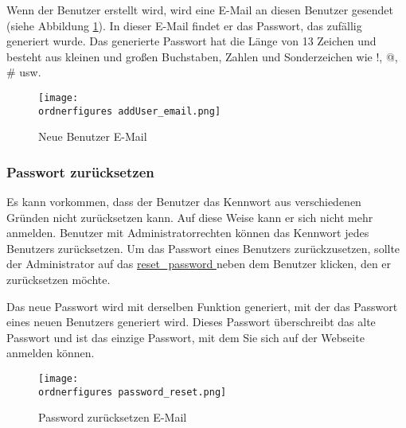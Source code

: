Wenn der Benutzer erstellt wird, wird eine E-Mail an diesen Benutzer gesendet (siehe Abbildung \ref{fi:addUser_email}). In dieser E-Mail findet er das Passwort, das zufällig generiert wurde. Das generierte Passwort hat die Länge von 13 Zeichen und besteht aus kleinen und großen Buchstaben, Zahlen und Sonderzeichen wie !, @, \# usw.
\begin{figure}[H]
	\centering
	\texttt{[image: \\ordnerfigures addUser\_email.png]}
	\caption{Neue Benutzer E-Mail}
	\label{fi:addUser_email}
\end{figure}


\subsubsection{Passwort zurücksetzen}

Es kann vorkommen, dass der Benutzer das Kennwort aus verschiedenen Gründen nicht zurücksetzen kann. Auf diese Weise kann er sich nicht mehr anmelden. Benutzer mit Administratorrechten können das Kennwort jedes Benutzers zurücksetzen. Um das Passwort eines Benutzers zurückzusetzen, sollte der Administrator auf das \underline{reset\_password }neben dem Benutzer klicken, den er zurücksetzen möchte.

Das neue Passwort wird mit derselben Funktion generiert, mit der das Passwort eines neuen Benutzers generiert wird. Dieses Passwort überschreibt das alte Passwort und ist das einzige Passwort, mit dem Sie sich auf der Webseite anmelden können.

\begin{figure}[H]
	\centering
	\texttt{[image: \\ordnerfigures password\_reset.png]}
	\caption{Password zurücksetzen E-Mail}
	\label{fi:password_reset}
\end{figure}


